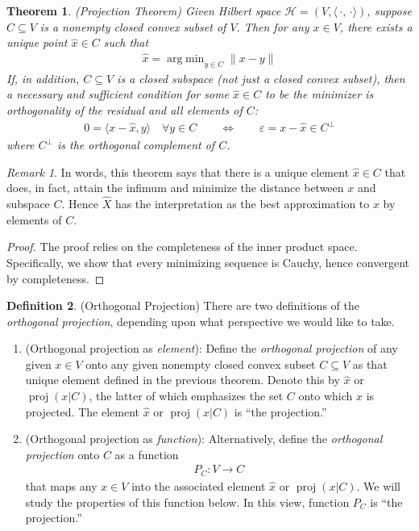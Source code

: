 \documentclass[12pt]{book}
\numberwithin{equation}{section} %
\theoremstyle{plain}
\newtheorem{thm}{Theorem}[section]
\theoremstyle{definition}
\newtheorem{defn}[thm]{Definition}
\theoremstyle{remark}
\newtheorem*{rmk}{Remark}
\newcommand{\ra}{\rightarrow}
\newcommand{\proj}{\operatorname{proj}}
\newcommand{\calH}{\mathcal{H}}
\DeclareMathOperator*{\argmin}{arg\;min}
\begin{document}
\begin{thm}\emph{(Projection Theorem)}
\label{thm:projthm}
Given Hilbert space $\calH=(V,\langle\,\cdot,\,\cdot\rangle)$,
suppose $C\subseteq V$ is a nonempty closed convex subset of $V$.
Then for any $x\in V$, there exists a unique point $\hat{x}\in C$
such that
\begin{align}
  \hat{x}
  =
  \argmin_{y\in C}
  \lVert x-y\rVert
  \label{projthm}
\end{align}
If, in addition, $C\subseteq V$ is a closed subspace (not just a closed
convex subset), then a necessary and sufficient condition for some
$\hat{x}\in C$ to be the minimizer is orthogonality of the residual and
all elements of $C$:
\begin{align}
  0=\langle x-\hat{x},y\rangle
  \quad\forall y\in C
  \qquad\iff\qquad
  \varepsilon=x-\hat{x}\in C^\perp
  \label{projthmresid}
\end{align}
where $C^\perp$ is the orthogonal complement of $C$.
\end{thm}
\begin{rmk}
In words, this theorem says that there is a unique element
$\hat{x}\in C$ that does, in fact, attain the infimum and minimize the
distance between $x$ and subspace $C$.
Hence $\hat{X}$ has the interpretation as the best approximation to $x$
by elements of $C$.
\end{rmk}
\begin{proof}
The proof relies on the completeness of the inner product space.
Specifically, we show that every minimizing sequence is Cauchy, hence
convergent by completeness.
\end{proof}


\begin{defn}(Orthogonal Projection)
\label{defn:projection}
There are two definitions of the \emph{orthogonal projection}, depending
upon what perspective we would like to take.
\begin{enumerate}[label=(\roman*)]
  \item (Orthogonal projection as \emph{element}):
    Define the \emph{orthogonal projection} of any given $x\in V$ onto
    any given nonempty closed convex subset $C\subseteq V$ as that
    unique element defined in the previous theorem.
    Denote this by $\hat{x}$ or $\proj(x|C)$, the latter of which
    emphasizes the set $C$ onto which $x$ is projected.
    The element $\hat{x}$ or $\proj(x|C)$ is ``the projection.''
  \item (Orthogonal projection as \emph{function}):
    Alternatively, define the \emph{orthogonal projection} onto $C$ as a
    function
    \begin{align*}
      P_C:V\ra C
    \end{align*}
    that maps any $x\in V$ into the associated element
    $\hat{x}$ or $\proj(x|C)$.
    We will study the properties of this function below.
    In this view, function $P_C$ is ``the projection.''
\end{enumerate}
\end{defn}
\end{document}
